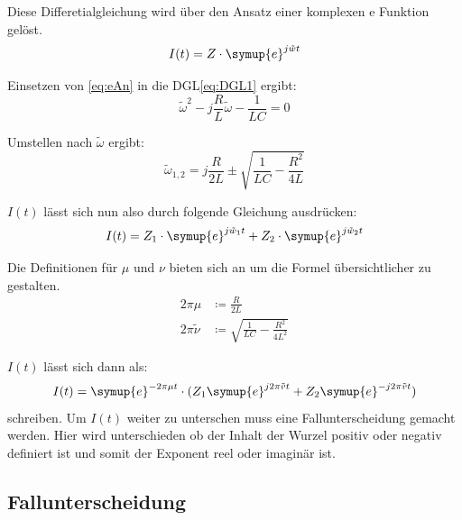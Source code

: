     \noindent Diese Differetialgleichung wird über den Ansatz einer komplexen e Funktion gelöst.
    \begin{equation}
        I(t) = Z \cdot \symup{e}^{j \tilde{w} t}
        \label{eq:eAn}
    \end{equation}

    \noindent Einsetzen von \ref{eq:eAn} in die DGL\ref{eq:DGL1} ergibt:
    \begin{equation}
        \tilde{\omega}^2 - j \frac{R}{L}\tilde{\omega} - \frac{1}{LC} = 0 \nonumber
    \end{equation}

    \noindent Umstellen nach $\tilde{\omega}$ ergibt:
    \begin{equation}
        \tilde{\omega}_{1,2} = j \frac{R}{2L} \pm \sqrt{\frac{1}{LC}-\frac{R^2}{4L}} \nonumber
    \end{equation}
    
    \noindent $I(t)$ lässt sich nun also durch folgende Gleichung ausdrücken:
    \begin{equation}
        I(t) = Z_1 \cdot \symup{e}^{j \tilde{w}_1t} + Z_2 \cdot \symup{e}^{j\tilde{w}_2 t} \nonumber
    \end{equation}
    
    \noindent Die Definitionen für $\mu$ und $\nu$ bieten sich an um die Formel übersichtlicher zu gestalten.
    \begin{align}
        2 \pi \mu & \coloneq \frac{R}{2L} \nonumber\\ 
        2 \pi \tilde{\nu} & \coloneq \sqrt{\frac{1}{LC} - \frac{R^2}{4L^2}} \nonumber
    \end{align}

    \noindent $I(t)$ lässt sich dann als:
    \begin{equation}
        I(t) = \symup{e}^{- 2 \pi \mu t} \cdot  (Z_1 \symup{e}^{j 2\pi \tilde{v}t} + Z_2 \symup{e}^{-j 2\pi \tilde{v} t}) \nonumber
    \end{equation}
    \noindent schreiben. Um $I(t)$ weiter zu unterschen muss eine Fallunterscheidung gemacht werden. Hier wird unterschieden ob der 
    Inhalt der Wurzel positiv oder negativ definiert ist und somit der Exponent reel oder imaginär ist. 
    \subsection{Fallunterscheidung}

